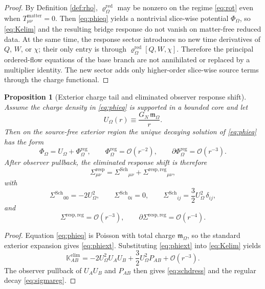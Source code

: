 \documentclass[11pt]{article}
\newcommand{\ProjSub}{P}
\newcommand{\ResponseShift}{\Sigma^{\mathrm{resp}}}
\newcommand{\ResponseShiftSch}{\Sigma^{\mathrm{Sch}}}
\newcommand{\ResponseShiftReg}{\Sigma^{\mathrm{resp,reg}}}
\newcommand{\AuxPol}{\mathbb K}
\newcommand{\FlowPot}{\Phi_\Omega}
\newcommand{\SourceDensityRed}{\varrho_\Omega^{\mathrm{red}}}
\newcommand{\HamChargeOmega}{\mathfrak m_\Omega}
\newtheorem{proposition}{Proposition}
\begin{document}
\begin{proof}
By Definition \ref{def:rho}, \(\SourceDensityRed\) may be nonzero on the regime \eqref{eq:rot} even when \(T_{\mu\nu}^{\mathrm{matter}}=0\). Then \eqref{eq:phieq} yields a nontrivial slice-wise potential \(\FlowPot\), so \eqref{eq:Kelim} and the resulting bridge response do not vanish on matter-free reduced data. At the same time, the response sector introduces no new time derivatives of \(Q\), \(W\), or \(\chi\); their only entry is through \(\SourceDensityRed[Q,W,\chi]\). Therefore the principal ordered-flow equations of the base branch are not annihilated or replaced by a multiplier identity. The new sector adds only higher-order slice-wise source terms through the charge functional.
\end{proof}

\begin{proposition}[Exterior charge tail and eliminated observer response shift]
\label{prop:tail}
Assume the charge density in \eqref{eq:phieq} is supported in a bounded core and let
\begin{equation}
U_\Omega(r)\equiv \frac{G_N\,\HamChargeOmega}{r}.
\label{eq:Uomega}
\end{equation}
Then on the source-free exterior region the unique decaying solution of \eqref{eq:phieq} has the form
\begin{equation}
\FlowPot
=
U_\Omega+\FlowPot^{\mathrm{reg}},
\qquad
\FlowPot^{\mathrm{reg}}=\mathcal O(r^{-2}),
\qquad
\partial\FlowPot^{\mathrm{reg}}=\mathcal O(r^{-3}).
\label{eq:phiext}
\end{equation}
After observer pullback, the eliminated response shift is therefore
\begin{equation}
\ResponseShift_{\mu\nu}
=
\ResponseShiftSch{}_{\mu\nu}
+\ResponseShiftReg{}_{\mu\nu},
\label{eq:sigmasplit}
\end{equation}
with
\begin{equation}
\ResponseShiftSch{}_{00}=-2U_\Omega^2,
\qquad
\ResponseShiftSch{}_{0i}=0,
\qquad
\ResponseShiftSch{}_{ij}=\frac32 U_\Omega^2\,\delta_{ij},
\label{eq:schdress}
\end{equation}
and
\begin{equation}
\ResponseShiftReg=\mathcal O(r^{-3}),
\qquad
\partial\ResponseShiftReg=\mathcal O(r^{-4}).
\label{eq:sigmareg}
\end{equation}
\end{proposition}

\begin{proof}
Equation \eqref{eq:phieq} is Poisson with total charge \(\HamChargeOmega\), so the standard exterior expansion gives \eqref{eq:phiext}. Substituting \eqref{eq:phiext} into \eqref{eq:Kelim} yields
\[
\AuxPol_{AB}^{\mathrm{elim}}
=
-2U_\Omega^2U_AU_B
+\frac32 U_\Omega^2\ProjSub_{AB}
+\mathcal O(r^{-3}).
\]
The observer pullback of \(U_AU_B\) and \(\ProjSub_{AB}\) then gives \eqref{eq:schdress} and the regular decay \eqref{eq:sigmareg}.
\end{proof}
\end{document}
